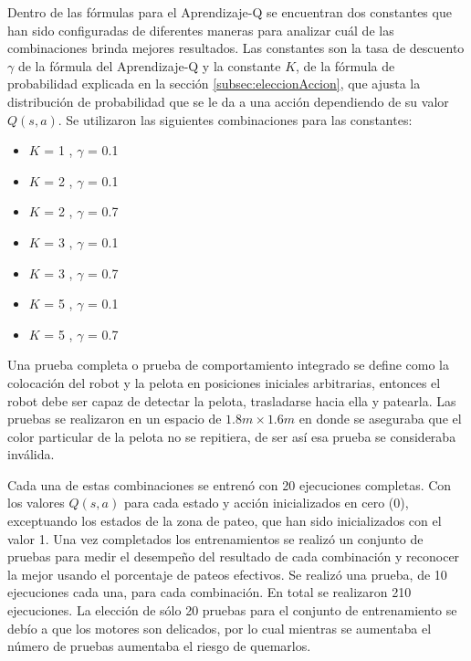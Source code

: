 Dentro de las fórmulas para el Aprendizaje-Q se encuentran dos constantes que han sido configuradas de diferentes maneras para analizar cuál de las combinaciones brinda mejores resultados. Las constantes son la tasa de descuento $\gamma$ de la fórmula del Aprendizaje-Q y la constante $K$, de la fórmula de probabilidad explicada en la secci\'on \ref{subsec:eleccionAccion}, que ajusta la distribución de probabilidad que se le da a una acción dependiendo de su valor $Q(s,a)$. Se utilizaron las siguientes combinaciones para las constantes:

\begin{itemize}
 \setlength\itemsep{0.3pt}
\item $K$ = 1 , $\gamma$ = 0.1
\item $K$ = 2 , $\gamma$ = 0.1 
\item $K$ = 2 , $\gamma$ = 0.7
\item $K$ = 3 , $\gamma$ = 0.1
\item $K$ = 3 , $\gamma$ = 0.7
\item $K$ = 5 , $\gamma$ = 0.1
\item $K$ = 5 , $\gamma$ = 0.7
   
\end{itemize}

Una prueba completa o prueba de comportamiento integrado se define como la colocaci\'on del robot y la pelota en posiciones iniciales arbitrarias, entonces el robot debe ser capaz de detectar la pelota, trasladarse hacia ella y patearla. Las pruebas se realizaron en un espacio de $1.8 m \times 1.6 m$
en donde se aseguraba que el color particular de la pelota no se repitiera, de ser así esa prueba se consideraba inválida.

Cada una de estas combinaciones se entrenó con 20 ejecuciones completas. Con los valores $Q(s,a)$ para cada estado y acción inicializados en cero (0), exceptuando los estados de la zona de pateo, que han sido inicializados con el valor 1. Una vez completados los entrenamientos se realizó un conjunto de pruebas para medir el desempeño del resultado de cada combinación y reconocer la mejor usando el porcentaje de pateos efectivos. Se realizó una prueba, de 10 ejecuciones cada una, para cada combinación. En total se realizaron 210 ejecuciones. La elecci\'on de s\'olo 20 pruebas para el conjunto de entrenamiento se deb\'io a que los motores son delicados, por lo cual mientras se aumentaba el n\'umero de pruebas aumentaba el riesgo de quemarlos.


